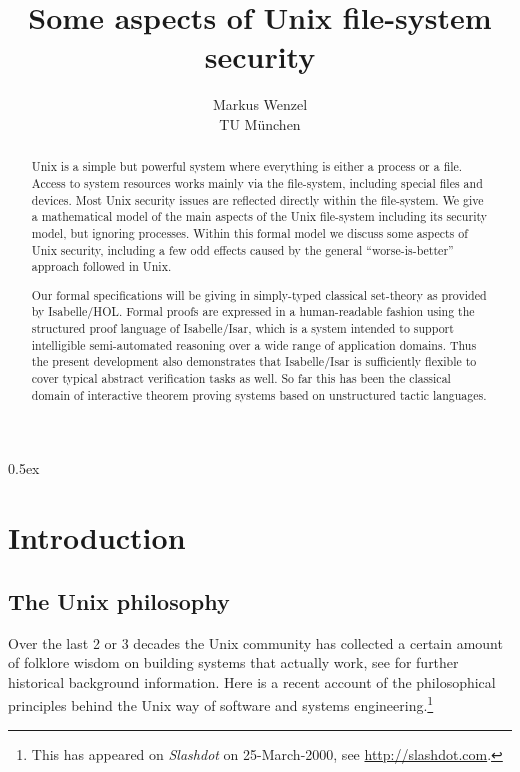 \documentclass[11pt,a4paper]{article}
\begin{document}
\title{Some aspects of Unix file-system security}
\author{Markus Wenzel \\ TU M\"unchen}
\maketitle

\begin{abstract}
  Unix is a simple but powerful system where everything is either a process or
  a file.  Access to system resources works mainly via the file-system,
  including special files and devices.  Most Unix security issues are
  reflected directly within the file-system.  We give a mathematical model of
  the main aspects of the Unix file-system including its security model, but
  ignoring processes.  Within this formal model we discuss some aspects of
  Unix security, including a few odd effects caused by the general
  ``worse-is-better'' approach followed in Unix.
  
  Our formal specifications will be giving in simply-typed classical
  set-theory as provided by Isabelle/HOL.  Formal proofs are expressed in a
  human-readable fashion using the structured proof language of Isabelle/Isar,
  which is a system intended to support intelligible semi-automated reasoning
  over a wide range of application domains.  Thus the present development also
  demonstrates that Isabelle/Isar is sufficiently flexible to cover typical
  abstract verification tasks as well.  So far this has been the classical
  domain of interactive theorem proving systems based on unstructured tactic
  languages.
\end{abstract}

\tableofcontents
\newpage

\parindent 0pt\parskip 0.5ex


\section{Introduction}\label{sec:unix-intro}

\subsection{The Unix philosophy}

Over the last 2 or 3 decades the Unix community has collected a certain amount
of folklore wisdom on building systems that actually work, see
\cite{Unix-heritage} for further historical background information.  Here is a
recent account of the philosophical principles behind the Unix way of software
and systems engineering.\footnote{This has appeared on \emph{Slashdot} on
  25-March-2000, see \url{http://slashdot.com}.}
\end{document}
